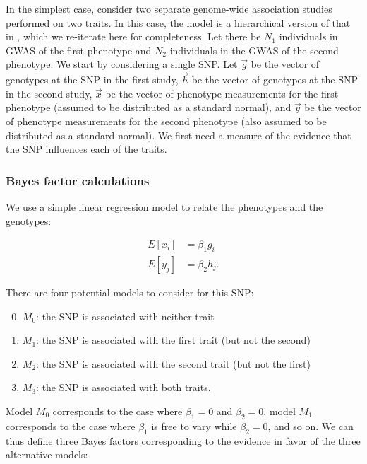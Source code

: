 \documentclass[11pt,titlepage]{article}
\begin{document}
In the simplest case, consider two separate genome-wide association studies performed on two traits. In this case, the model is a hierarchical version of that in \citet{Giambartolomei:2014aa}, which we re-iterate here for completeness. Let there be $N_1$ individuals in GWAS of the first phenotype and $N_2$ individuals in the GWAS of the second phenotype. We start by considering a single SNP. Let $\vec g$ be the vector of genotypes at the SNP in the first study, $\vec h$ be the vector of genotypes at the SNP in the second study, $\vec x$ be the vector of phenotype measurements for the first phenotype (assumed to be distributed as a standard normal), and $\vec y$ be the vector of phenotype measurements for the second phenotype (also assumed to be distributed as a standard normal). We first need a measure of the evidence that the SNP influences each of the traits.

\subsubsection{Bayes factor calculations} \label{snp_bf}
We use a simple linear regression model to relate the phenotypes and the genotypes:

\begin{align}
E[x_i] &= \beta_1 g_i \\
E[y_j] &= \beta_2 h_j.
\end{align}

There are four potential models to consider for this SNP:

\begin{enumerate}
\setcounter{enumi}{-1}
\item $M_0$: the SNP is associated with neither trait
\item $M_1$: the SNP is associated with the first trait (but not the second)
\item $M_2$: the SNP is associated with the second trait (but not the first)
\item $M_3$: the SNP is associated with both traits.
\end{enumerate}

Model $M_0$ corresponds to the case where $\beta_1 = 0$ and $\beta_2 = 0$, model $M_1$ corresponds to the case where $\beta_1$ is free to vary while $\beta_2 = 0$, and so on. We can thus define three Bayes factors corresponding to the evidence in favor of the three alternative models:
\end{document}
